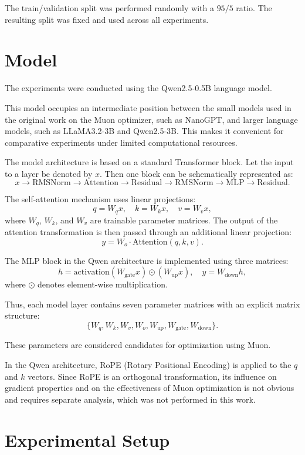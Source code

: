 \documentclass{article}
\begin{document}
The train/validation split was performed randomly with a $95/5$ ratio. The resulting split was fixed and used across all experiments.

\section{Model}

The experiments were conducted using the Qwen2.5-0.5B language model.

This model occupies an intermediate position between the small models used in the original work on the Muon optimizer, such as NanoGPT, and larger language models, such as LLaMA3.2-3B and Qwen2.5-3B. This makes it convenient for comparative experiments under limited computational resources.

The model architecture is based on a standard Transformer block. Let the input to a layer be denoted by $x$. Then one block can be schematically represented as:
\[
x \rightarrow \mathrm{RMSNorm} \rightarrow \mathrm{Attention} \rightarrow \mathrm{Residual} \rightarrow \mathrm{RMSNorm} \rightarrow \mathrm{MLP} \rightarrow \mathrm{Residual}.
\]

The self-attention mechanism uses linear projections:
\[
q = W_q x, \quad k = W_k x, \quad v = W_v x,
\]
where $W_q$, $W_k$, and $W_v$ are trainable parameter matrices. The output of the attention transformation is then passed through an additional linear projection:
\[
y = W_o \cdot \mathrm{Attention}(q, k, v).
\]

The MLP block in the Qwen architecture is implemented using three matrices:
\[
h = \mathrm{activation}(W_{\text{gate}} x) \odot (W_{\text{up}} x), \quad y = W_{\text{down}} h,
\]
where $\odot$ denotes element-wise multiplication.

Thus, each model layer contains seven parameter matrices with an explicit matrix structure:
\[
\{ W_q, W_k, W_v, W_o, W_{\text{up}}, W_{\text{gate}}, W_{\text{down}} \}.
\]

These parameters are considered candidates for optimization using Muon.

In the Qwen architecture, RoPE (Rotary Positional Encoding) is applied to the $q$ and $k$ vectors. Since RoPE is an orthogonal transformation, its influence on gradient properties and on the effectiveness of Muon optimization is not obvious and requires separate analysis, which was not performed in this work.

\section{Experimental Setup}
\end{document}
